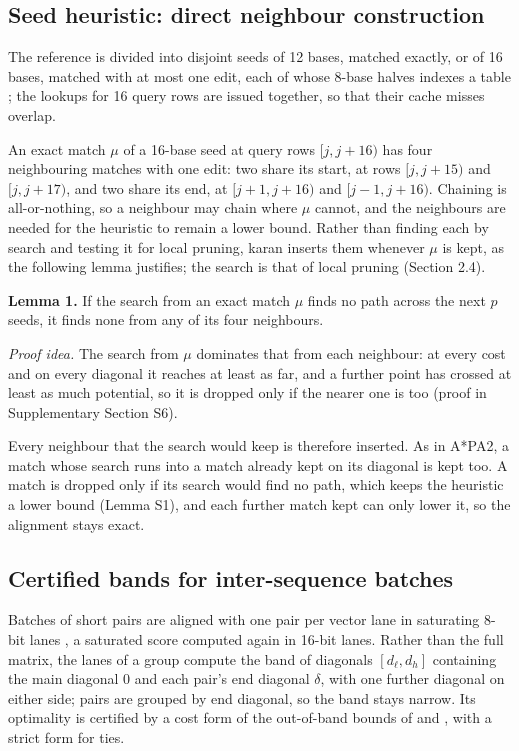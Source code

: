 \subsection{Seed heuristic: direct neighbour construction}

The reference is divided into disjoint seeds of 12 bases, matched exactly, or of 16 bases, matched with at most one edit, each of whose 8-base halves indexes a table \citep{GrootKoerkamp2024astarpa}; the lookups for 16 query rows are issued together, so that their cache misses overlap.

An exact match \(\mu\) of a 16-base seed at query rows \([j, j+16)\) has four neighbouring matches with one edit: two share its start, at rows \([j, j+15)\) and \([j, j+17)\), and two share its end, at \([j+1, j+16)\) and \([j-1, j+16)\). Chaining is all-or-nothing, so a neighbour may chain where \(\mu\) cannot, and the neighbours are needed for the heuristic to remain a lower bound. Rather than finding each by search and testing it for local pruning, karan inserts them whenever \(\mu\) is kept, as the following lemma justifies; the search is that of local pruning (Section 2.4).

\textbf{Lemma 1.} If the search from an exact match \(\mu\) finds no path across the next \(p\) seeds, it finds none from any of its four neighbours.

\emph{Proof idea.} The search from \(\mu\) dominates that from each neighbour: at every cost and on every diagonal it reaches at least as far, and a further point has crossed at least as much potential, so it is dropped only if the nearer one is too (proof in Supplementary Section S6).

Every neighbour that the search would keep is therefore inserted. As in A*PA2, a match whose search runs into a match already kept on its diagonal is kept too. A match is dropped only if its search would find no path, which keeps the heuristic a lower bound (Lemma S1), and each further match kept can only lower it, so the alignment stays exact.

\subsection{Certified bands for inter-sequence batches}

Batches of short pairs are aligned with one pair per vector lane \citep{Rognes2011swipe,Rahn2018seqan} in saturating 8-bit lanes \citep{Zhao2013ssw,Daily2016parasail}, a saturated score computed again in 16-bit lanes. Rather than the full matrix, the lanes of a group compute the band of diagonals \([d_\ell, d_h]\) containing the main diagonal 0 and each pair's end diagonal \(\delta\), with one further diagonal on either side; pairs are grouped by end diagonal, so the band stays narrow. Its optimality is certified by a cost form of the out-of-band bounds of \citet{Gibrat2018band} and \citet{Fujiki2020seedex}, with a strict form for ties.

